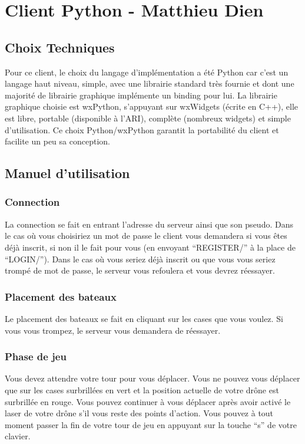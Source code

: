 \documentclass[a4paper, 11pt]{report}
\begin{document}
\chapter{Client Python - Matthieu Dien}

\section{Choix Techniques}

Pour ce client, le choix du langage d'implémentation a été Python car c'est un langage haut niveau, simple, 
avec une librairie standard très fournie et dont une majorité de librairie graphique implémente
un binding pour lui. La librairie graphique choisie est wxPython, s'appuyant sur wxWidgets (écrite en C++), elle est libre, portable 
(disponible à l'ARI), complète (nombreux widgets) et simple d'utilisation.
Ce choix Python/wxPython garantit la portabilité du client et facilite un peu sa conception.

\section{Manuel d'utilisation}
\subsection{Connection}
La connection se fait en entrant l'adresse du serveur ainsi que son pseudo. Dans le cas où vous choisiriez un mot de passe le client 
vous demandera si vous êtes déjà inscrit, si non il le fait pour vous (en envoyant ``REGISTER/'' à la place de ``LOGIN/''). Dans le cas où vous seriez déjà 
inscrit ou que vous vous seriez trompé de mot de passe, le serveur vous refoulera et vous devrez réessayer.

\subsection{Placement des bateaux}
Le placement des bateaux se fait en cliquant sur les cases que vous voulez. Si vous vous trompez, le serveur vous demandera de réessayer.

\subsection{Phase de jeu}
Vous devez attendre votre tour pour vous déplacer. Vous ne pouvez vous déplacer que sur les cases surbrillées en vert et la position 
actuelle de votre drône est surbrillée en rouge. Vous pouvez continuer à vous déplacer après avoir activé le laser de votre drône s'il vous reste des points d'action. 
Vous pouvez à tout moment passer la fin de votre tour de jeu en appuyant sur la touche ``s'' de votre clavier.
\end{document}
